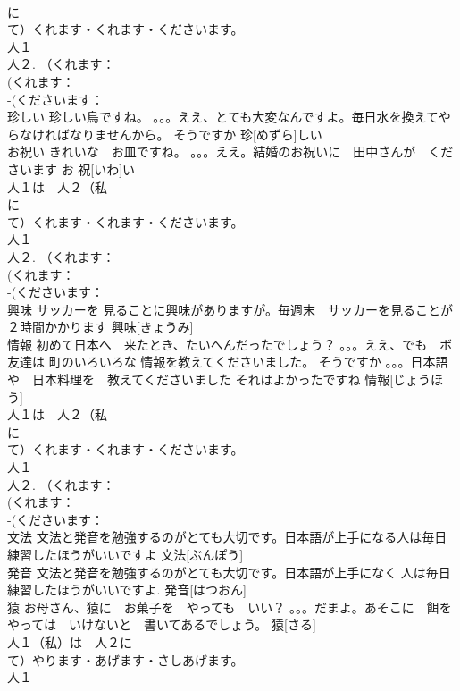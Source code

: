 \documentclass[8pt]{extreport}
\begin{document}
\begin{CJK}{UTF8}{min}
\\	に　
\\	て）くれます・くれます・くださいます。
\\	人１
\\	人２. （くれます：
\\	(くれます：
\\	-(くださいます：
\\	珍しい	珍しい鳥ですね。 。。。ええ、とても大変なんですよ。毎日水を換えてやらなければなりませんから。 そうですか	珍[めずら]しい			
\\	お祝い	きれいな　お皿ですね。 。。。ええ。結婚のお祝いに　田中さんが　くださいます	お 祝[いわ]い			
\\	人１は　人２（私
\\	に　
\\	て）くれます・くれます・くださいます。
\\	人１
\\	人２. （くれます：
\\	(くれます：
\\	-(くださいます：
\\	興味	サッカーを 見ることに興味がありますが。毎週末　サッカーを見ることが　２時間かかります	興味[きょうみ]			
\\	情報	初めて日本へ　来たとき、たいへんだったでしょう？ 。。。ええ、でも　ボ友達は 町のいろいろな 情報を教えてくださいました。 そうですか 。。。日本語や　日本料理を　教えてくださいました それはよかったですね	情報[じょうほう]			
\\	人１は　人２（私
\\	に　
\\	て）くれます・くれます・くださいます。
\\	人１
\\	人２. （くれます：
\\	(くれます：
\\	-(くださいます：
\\	文法	文法と発音を勉強するのがとても大切です。日本語が上手になる人は毎日練習したほうがいいですよ	文法[ぶんぽう]			
\\	発音	文法と発音を勉強するのがとても大切です。日本語が上手になく 人は毎日練習したほうがいいですよ.	発音[はつおん]			
\\	猿	お母さん、猿に　お菓子を　やっても　いい？ 。。。だまよ。あそこに　餌を　やっては　いけないと　書いてあるでしょう。	猿[さる]			
\\	人１（私）は　人２に　
\\	て）やります・あげます・さしあげます。
\\	人１

\end{CJK}
\end{document}
